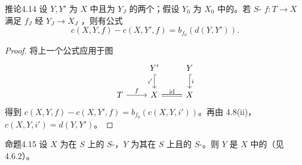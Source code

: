 \begin{SGAresult}{推论}{4.14}
设 $Y,Y'$ 为 $X$ 中且为 $Y_J$ 的两个；假设 $Y_0$ 为 $X_0$ 中的。若 $S$- $f:T\to X$ 满足 $f_J$ 经 $Y_J\to X_J$ ，则有公式
\[c(X,Y,f)-c(X,Y',f)=b_{f_0}(d(Y,Y')).\]
\end{SGAresult}
\begin{proof}
将上一个公式应用于图
\[
\begin{tikzcd}
&Y'\arrow[d,hook,"i'"']&Y\arrow[d,hook,"i"]\\
T\arrow[r,"f"]&X\arrow[r,equal,"\mathrm{id}"]&X
\end{tikzcd}
\]
得到 $c(X,Y,f)-c(X,Y',f)=b_{f_0}(c(X,Y,i'))$。再由 4.8(ii)，$c(X,Y,i')=d(Y,Y')$。
\end{proof}
\begin{SGAresult}{命题}{4.15}
设 $X$ 为在 $S$ 上的 $S$-，$Y$ 为其在 $S$ 上且的 $S$-。则 $Y$ 是 $X$ 中的（见 4.6.2）。
\end{SGAresult}
